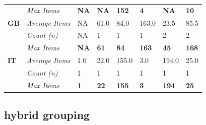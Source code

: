 \documentclass[
  american,
  10,
  a4paper,
]{book}
\theoremstyle{definition}
\theoremstyle{remark}
\begin{document}
\begin{table}
\begin{tabular*}{\linewidth}
{} & {\itshape Max Items} & {\bfseries NA} & {\bfseries NA} & {\bfseries 152} & {\bfseries 4} & {\bfseries NA} & {\bfseries 10} \\ 
{\bfseries GB} & {\itshape Average Items} & NA & 61.0 & 84.0 & 163.0 & 23.5 & 85.5 \\ 
{} & {\itshape Count (n)} & NA & 1 & 1 & 1 & 2 & 2 \\ 
{} & {\itshape Max Items} & {\bfseries NA} & {\bfseries 61} & {\bfseries 84} & {\bfseries 163} & {\bfseries 45} & {\bfseries 168} \\ 
{\bfseries IT} & {\itshape Average Items} & 1.0 & 22.0 & 155.0 & 3.0 & 194.0 & 25.0 \\ 
{} & {\itshape Count (n)} & 1 & 1 & 1 & 1 & 1 & 1 \\ 
{} & {\itshape Max Items} & {\bfseries 1} & {\bfseries 22} & {\bfseries 155} & {\bfseries 3} & {\bfseries 194} & {\bfseries 25} \\ 
\bottomrule
\end{tabular*}
\end{table}

\subsection{hybrid grouping}\label{hybrid-grouping}
\end{document}
